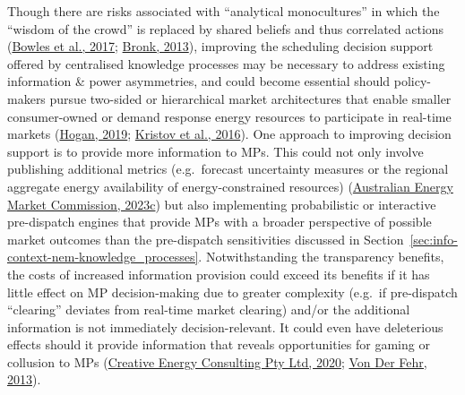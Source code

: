\documentclass[12pt,a4paper,]{report}
\begin{document}
Though there are risks associated with ``analytical monocultures'' in
which the ``wisdom of the crowd'' is replaced by shared beliefs and thus
correlated actions
(\protect\hyperlink{ref-bowlesRetrospectivesFriedrichHayek2017}{Bowles
et al., 2017}; \protect\hyperlink{ref-bronkHayekWisdomPrices2013}{Bronk,
2013}), improving the scheduling decision support offered by centralised
knowledge processes may be necessary to address existing information \&
power asymmetries, and could become essential should policy-makers
pursue two-sided or hierarchical market architectures that enable
smaller consumer-owned or demand response energy resources to
participate in real-time markets
(\protect\hyperlink{ref-hoganMarketDesignPractices2019}{Hogan, 2019};
\protect\hyperlink{ref-kristovTaleTwoVisions2016}{Kristov et al.,
2016}). One approach to improving decision support is to provide more
information to MPs. This could not only involve publishing additional
metrics (e.g.~forecast uncertainty measures or the regional aggregate
energy availability of energy-constrained resources)
(\protect\hyperlink{ref-australianenergymarketcommissionOperatingReserveMarket2023}{Australian
Energy Market Commission, 2023c}) but also implementing probabilistic or
interactive pre-dispatch engines that provide MPs with a broader
perspective of possible market outcomes than the pre-dispatch
sensitivities discussed in
Section~\ref{sec:info-context-nem-knowledge_processes}. Notwithstanding
the transparency benefits, the costs of increased information provision
could exceed its benefits if it has little effect on MP decision-making
due to greater complexity (e.g.~if pre-dispatch ``clearing'' deviates
from real-time market clearing) and/or the additional information is not
immediately decision-relevant. It could even have deleterious effects
should it provide information that reveals opportunities for gaming or
collusion to MPs
(\protect\hyperlink{ref-creativeenergyconsultingptyltdSchedulingAheadMarkets2020}{Creative
Energy Consulting Pty Ltd, 2020};
\protect\hyperlink{ref-vonderfehrTransparencyElectricityMarkets2013}{Von
Der Fehr, 2013}).
\end{document}
